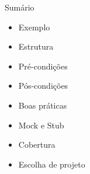 
\begin{frame}{Sumário}
    \begin{itemize}
        \item Exemplo
        \item Estrutura
        \item Pré-condições
        \item Pós-condições
        \item Boas práticas
        \item Mock e Stub
        \item Cobertura
        \item Escolha de projeto
    \end{itemize}
\end{frame}